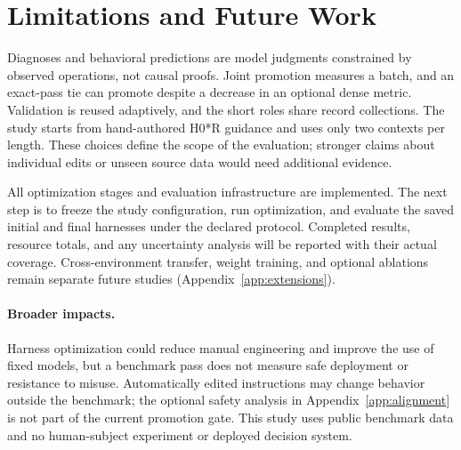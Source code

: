 \documentclass{article}
\begin{document}




\section{Limitations and Future Work}
\label{sec:limitations}

Diagnoses and behavioral predictions are model judgments constrained by observed
operations, not causal proofs. Joint promotion measures a batch, and an
exact-pass tie can promote despite a decrease in an optional dense metric.
Validation is reused adaptively, and the short roles share record collections.
The study starts from hand-authored H0*R guidance and uses only two contexts per
length. These choices define the scope of the evaluation; stronger claims about
individual edits or unseen source data would need additional evidence.

All optimization stages and evaluation infrastructure are implemented. The next
step is to freeze the study configuration, run optimization, and evaluate the
saved initial and final harnesses under the declared protocol. Completed results,
resource totals, and any uncertainty analysis will be reported with their actual
coverage. Cross-environment transfer, weight training, and optional ablations
remain separate future studies (Appendix~\ref{app:extensions}).

\paragraph{Broader impacts.}
Harness optimization could reduce manual engineering and improve the use of
fixed models, but a benchmark pass does not measure safe deployment or resistance
to misuse. Automatically edited instructions may change behavior outside the
benchmark; the optional safety analysis in Appendix~\ref{app:alignment} is not
part of the current promotion gate. This study uses public benchmark data and
no human-subject experiment or deployed decision system.

\clearpage



\clearpage
\appendix

\clearpage

\end{document}
